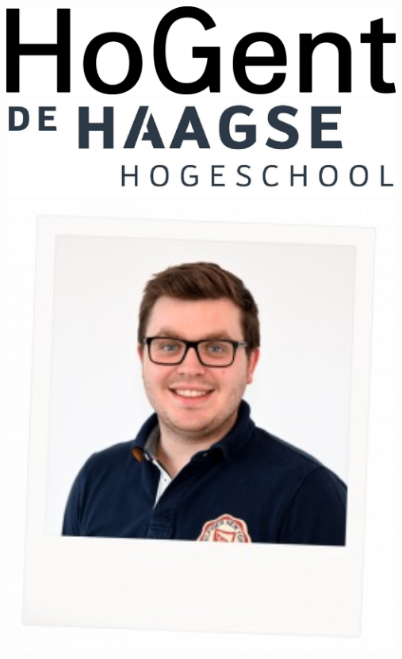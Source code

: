 \documentclass[a0,portrait]{a0poster}
\begin{document}
\begin{minipage}[t]{0.25\linewidth}
\includegraphics[width=13cm,right]{figures/HG-woordmerk.jpg} 
\includegraphics[width=13cm,right]{figures/HH.jpg}
\includegraphics[width=13cm,right]{figures/Laurens.jpg}
\end{minipage}

\vspace{1cm} %

\end{document}
